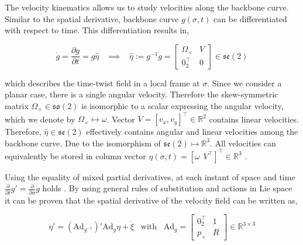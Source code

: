 The velocity kinematics allows us to study velocities along the backbone curve. Similar to the spatial derivative, backbone curve $g(\sigma,t)$ can be differentiated with respect to time. This differentiation results in, 

\begin{equation}
  \Dot{g} = \frac{\partial g}{\partial t} = g \hat{\eta} \hspace{10pt} \implies \hspace{10pt}  \hat{\eta} := g^{-1}\dot{g} = \begin{bmatrix} \Omega_\times & V \\ 0_2^\top & 0 \end{bmatrix} \in  \mathfrak{se}(2)
    \label{eq2:dgdt}
\end{equation}

which describes the time-twist field in a local frame at $\sigma$. Since we consider a planar case, there is a single angular velocity. Therefore the skew-symmetric matrix $\Omega_\times \in \mathfrak{so}(2)$ is isomorphic to a scalar expressing the angular velocity, which we denote by $\Omega_\times \longmapsto \omega$. Vector $V = [v_x,v_y]^\top \in \mathbb{R}^2$ contains linear velocities. Therefore, $\hat{\eta} \in \mathfrak{se}(2)$ effectively contains angular and linear velocities among the backbone curve. Due to the isomorphism of $\mathfrak{se}(2) \longmapsto \mathbb{R}^3$. All velocities can equivalently be stored in column vector $\eta(\sigma,t) = [\omega \hspace{5pt} V^\top]^\top \in \mathbb{R}^3$ \cite{Sola2018}.


Using the equality of mixed partial derivatives, at each instant of space and time $\frac{\partial}{\partial t}g' = \frac{\partial}{\partial \sigma}\dot{g}$ holds \cite{Caasenbrood2020}. By using general rules of substitution and actions in Lie space it can be proven that the spatial derivative of the velocity field can be written as,

\begin{equation}
    \eta'= (\text{Ad}_{g^{-1}})'\text{Ad}_g \eta + \Dot{\xi} \hspace{10pt} \text{with} \hspace{10pt} \text{Ad}_g = \begin{bmatrix} 0_2^\top & 1 \\ p_\times & R  \end{bmatrix} \in \mathbb{R}^{3\times 3}
    \label{eq2:etadif}
\end{equation}


